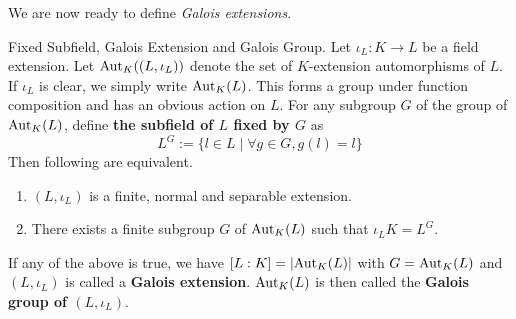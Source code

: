 \documentclass[../book.tex]{subfiles}
\begin{document}
We are now ready to define \emph{Galois extensions}. 

\begin{dfn} Fixed Subfield, Galois Extension and Galois Group.
    Let $\iota_L : K \to L$ be a field extension.
    Let $\text{Aut}_{K}((L,\iota_L))$ denote the set of $K$-extension automorphisms of $L$.
    If $\iota_L$ is clear, we simply write $\text{Aut}_{K}(L)$. 
    This forms a group under function composition and has an obvious action on $L$. 
    For any subgroup $G$ of the group of $\text{Aut}_{K}(L)$, 
    define \textbf{the subfield of $L$ fixed by $G$} as
    \[ L^G := \{l \in L \mid \forall g \in G, g(l)=l\} \]
    Then following are equivalent.
    \begin{enumerate}
        \item $(L,\iota_L)$ is a finite, normal and separable extension.
        \item There exists a finite subgroup $G$ of $\text{Aut}_{K}(L)$ such that
        $\iota_L K = L^G$. 
    \end{enumerate} 
    If any of the above is true, 
    we have $[L : K] = |\text{Aut}_{K}(L)|$ with $G = \text{Aut}_{K}(L)$
    and $(L,\iota_L)$ is called a \textbf{Galois extension}.
    $\text{Aut}_{K}(L)$ is then called the \textbf{Galois group of $(L,\iota_L)$}.
\end{dfn}
\end{document}
